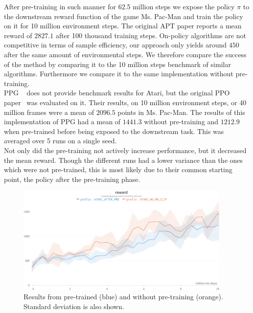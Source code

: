 \documentclass{article}
\begin{document}
\noindent After pre-training in such manner for 62.5 million steps we expose the policy $\pi$ to the downstream
reward function of the game Ms. Pac-Man and train the policy on it for 10 million environment steps.
The original APT paper reports a mean reward of $2827.1$ after 100 thousand training steps. On-policy algorithms
are not competitive in terms of sample efficiency, our approach only yields around $450$ after the same amount of
environmental steps. We therefore compare the success of the method by comparing
it to the 10 million steps benchmark of similar algorithms. Furthermore we compare
it to the same implementation without pre-training.\\
PPG ~\cite{DBLP:journals/corr/abs-2009-04416} does not provide benchmark results for Atari, but the original PPO
paper~\cite{DBLP:journals/corr/SchulmanWDRK17} was evaluated on it. Their results, on 10 million environment steps, or 40
million frames were a mean of $2096.5$ points in Ms. Pac-Man.
The results of this implementation of PPG had a mean of $1441.3$ without pre-training and $1212.9$ when pre-trained
before being exposed to the downstream task. This was averaged over 5 runs on a single seed.\\
Not only did the pre-training not actively increase performance, but it decreased the mean reward. 
Though the different runs had a lower variance than the ones which were not pre-trained, this is most
likely due to their common starting point, the policy after the pre-training phase.

\begin{figure}[h]
  \centering
  \includegraphics[width = 300pt]{result_fix.png}
  \caption{Results from pre-trained (blue) and without pre-training (orange). Standard deviation is also shown.}
\end{figure}
\end{document}
